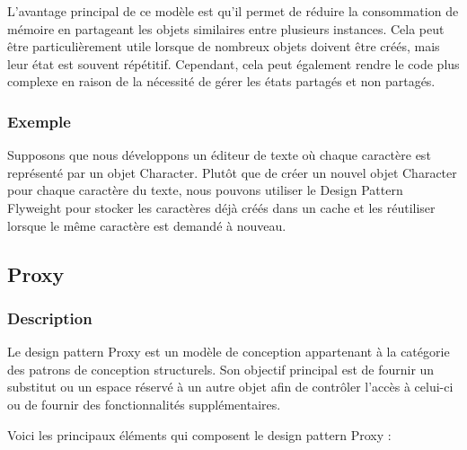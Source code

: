 L'avantage principal de ce modèle est qu'il permet de réduire la consommation de mémoire en partageant les objets similaires entre plusieurs instances. Cela peut être particulièrement utile lorsque de nombreux objets doivent être créés, mais leur état est souvent répétitif. Cependant, cela peut également rendre le code plus complexe en raison de la nécessité de gérer les états partagés et non partagés.


\subsubsection{Exemple}

Supposons que nous développons un éditeur de texte où chaque caractère est représenté par un objet Character. Plutôt que de créer un nouvel objet Character pour chaque caractère du texte, nous pouvons utiliser le Design Pattern Flyweight pour stocker les caractères déjà créés dans un cache et les réutiliser lorsque le même caractère est demandé à nouveau.




\newpage

\subsection{Proxy}

\subsubsection{Description}

Le design pattern Proxy est un modèle de conception appartenant à la catégorie des patrons de conception structurels. Son objectif principal est de fournir un substitut ou un espace réservé à un autre objet afin de contrôler l'accès à celui-ci ou de fournir des fonctionnalités supplémentaires.

Voici les principaux éléments qui composent le design pattern Proxy :

